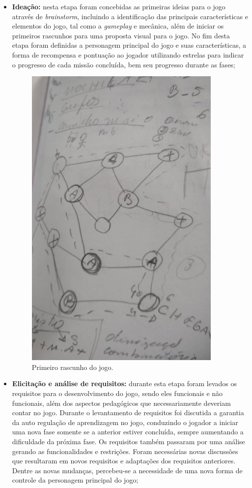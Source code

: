 \documentclass[10pt, conference, compsocconf]{IEEEtran}
\begin{document}
\begin{itemize}
	\item \textbf{Ideação:} nesta etapa foram concebidas as primeiras ideias para o jogo através de \textit{brainstorm}, incluindo a identificação das principais características e elementos do jogo, tal como a \textit{gameplay} e mecânica, além de iniciar os primeiros rascunhos para uma proposta visual para o jogo. No fim desta etapa foram definidas a personagem principal do jogo e suas características, a forma de recompensa e pontuação ao jogador utilizando estrelas para indicar o progresso de cada missão concluída, bem seu progresso durante as fases;
	
	\begin{figure}[!ht]
		\centering
		\includegraphics[width=0.4\linewidth]{Figuras/prototipo.jpg}		
		\caption{Primeiro rascunho do jogo.}
		\label{prototipo1}
	\end{figure}
	
	\item \textbf{Elicitação e análise de requisitos:} durante esta etapa foram levados os requisitos para o desenvolvimento do jogo, sendo eles funcionais e não funcionais, além dos aspectos pedagógicos que necessariamente deveriam contar no jogo. Durante o levantamento de requisitos foi discutida a garantia da auto regulação de aprendizagem no jogo, conduzindo o jogador a iniciar uma nova fase somente se a anterior estiver concluída, sempre aumentando a dificuldade da próxima fase. Os requisitos também passaram por uma análise gerando as funcionalidades e restrições. Foram necessárias novas discussões que resultaram em novos requisitos e adaptações dos requisitos anteriores. Dentre as novas mudanças, percebeu-se a necessidade de uma nova forma de controle da personagem principal do jogo;
	

\end{itemize}
\end{document}
